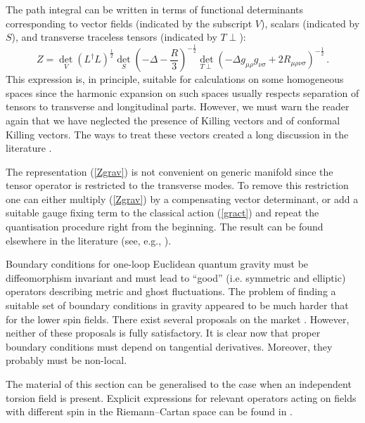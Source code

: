 The path integral can be written in terms of functional determinants
corresponding to vector fields (indicated by the subscript $V$),
scalars (indicated by $S$), and transverse traceless tensors
(indicated by $T\perp$): 
\begin{equation}
Z=\det_V (L^\dag L)^{\frac 12}\det_{S} \left(-\Delta -\frac R3 
\right)^{-\frac 12} \det_{T\perp}(-\Delta g_{\mu \rho } g_{\nu \sigma}
+2R_{\mu \rho \nu \sigma})^{-\frac 12}
\,.\label{Zgrav}
\end{equation}
This expression is, in principle,
suitable for calculations on some homogeneous spaces since the harmonic
expansion on such spaces usually respects separation of tensors
to transverse and longitudinal parts. However, we must warn the reader
again that we have neglected the presence 
of Killing vectors and of conformal Killing vectors. 
The ways to treat these vectors created a long discussion in the
literature 
\cite{Gibbons:1978ji,Christensen:1980iy,Fradkin:1984mq,Allen:1986ta,
Griffin:1989sq,Taylor:1990ua,Vassilevich:1993rk,Mottola:1995sj,
Volkov:2000ih}.

The representation (\ref{Zgrav}) is not convenient on generic
manifold since the tensor operator is restricted to the
transverse modes. To remove this restriction one can either
multiply (\ref{Zgrav}) by a compensating vector determinant, or
add a suitable gauge fixing term to the classical action
(\ref{gract}) and repeat the quantisation procedure right from
the beginning. The result can be found elsewhere in the
literature (see, e.g., 
\cite{Gibbons:1978ji,Christensen:1980iy,Fradkin:1984mq,Taylor:1990ua}).

Boundary conditions for one-loop Euclidean quantum gravity
must be diffeomorphism invariant and must lead to ``good''
(i.e. symmetric and elliptic) operators describing metric
and ghost fluctuations. The problem of finding a suitable set
of boundary conditions in gravity appeared to be much harder
that for the lower spin fields. There exist several
proposals on the market
\cite{Barvinsky:1987dg,Luckock:1990xr,Esposito:1995aj,Vassilevich:1995zk,
Marachevsky:1996dr,
Avramidi:1996ae,Avramidi:1997hy,Avramidi:1998sh,Moss:1997ip,Esposito:1998hp}.
However, neither of these proposals is fully satisfactory.
It is clear now that proper boundary conditions must depend on
tangential derivatives. Moreover, they probably must be non-local.

The material of this section can be generalised to the case
when an independent torsion field is present.
Explicit expressions for relevant operators acting on fields 
with different spin in the Riemann--Cartan space can be found in
\cite{Obukhov:1983mm,Cognola:1988qw,Yajima:1988eh}.


